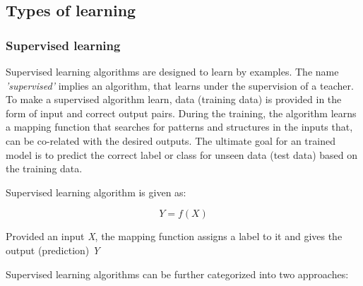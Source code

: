 \subsection{Types of learning} \label{Learning Techniques}

\subsubsection{Supervised learning}

Supervised learning algorithms are designed to learn by examples. The name \textit{'supervised'} implies an algorithm, that learns under the supervision of a teacher. To make a supervised algorithm learn, data (training data) is provided in the form of input and correct output pairs.
During the training, the algorithm learns a mapping function that searches for patterns and structures in the inputs that, can be co-related with the desired outputs. The ultimate goal for an trained model is to predict the correct label or class for unseen data (test data) based on the training data. 


\par

Supervised learning algorithm is  given as:

\begin{equation}
    Y = f(X)
\end{equation}

Provided an input \textit{X}, the mapping function assigns a label to it and gives the output (prediction) \textit{Y}

\par

Supervised learning algorithms can be further categorized into two approaches: 


